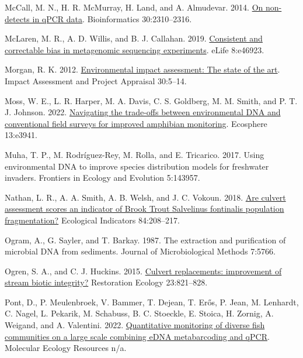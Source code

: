 \documentclass[
]{article}
\newlength{\cslhangindent}
\newlength{\cslentryspacingunit} %
\newenvironment{CSLReferences}[2] %
 {%
  \setlength{\parindent}{0pt}
  \ifodd #1
  \let\oldpar\par
  \def\par{\hangindent=\cslhangindent\oldpar}
  \fi
  \setlength{\parskip}{#2\cslentryspacingunit}
 }%
 {}
\begin{document}
\begin{CSLReferences}{1}{0}
\leavevmode{}%
McCall, M. N., H. R. McMurray, H. Land, and A. Almudevar. 2014.
\href{https://doi.org/10.1093/bioinformatics/btu239}{On non-detects in
qPCR data}. Bioinformatics 30:2310--2316.

\leavevmode{}%
McLaren, M. R., A. D. Willis, and B. J. Callahan. 2019.
\href{https://doi.org/10.7554/eLife.46923}{Consistent and correctable
bias in metagenomic sequencing experiments}. eLife 8:e46923.

\leavevmode{}%
Morgan, R. K. 2012.
\href{https://doi.org/10.1080/14615517.2012.661557}{Environmental impact
assessment: The state of the art}. Impact Assessment and Project
Appraisal 30:5--14.

\leavevmode{}%
Moss, W. E., L. R. Harper, M. A. Davis, C. S. Goldberg, M. M. Smith, and
P. T. J. Johnson. 2022.
\href{https://doi.org/10.1002/ecs2.3941}{Navigating the trade-offs
between environmental DNA and conventional field surveys for improved
amphibian monitoring}. Ecosphere 13:e3941.

\leavevmode{}%
Muha, T. P., M. Rodríguez-Rey, M. Rolla, and E. Tricarico. 2017. Using
environmental DNA to improve species distribution models for freshwater
invaders. Frontiers in Ecology and Evolution 5:143957.

\leavevmode{}%
Nathan, L. R., A. A. Smith, A. B. Welsh, and J. C. Vokoun. 2018.
\href{https://doi.org/10.1016/j.ecolind.2017.08.033}{Are culvert
assessment scores an indicator of Brook Trout Salvelinus fontinalis
population fragmentation?} Ecological Indicators 84:208--217.

\leavevmode{}%
Ogram, A., G. Sayler, and T. Barkay. 1987. The extraction and
purification of microbial DNA from sediments. Journal of Microbiological
Methods 7:5766.

\leavevmode{}%
Ogren, S. A., and C. J. Huckins. 2015.
\href{https://doi.org/10.1111/rec.12250}{Culvert replacements:
improvement of stream biotic integrity?} Restoration Ecology
23:821--828.

\leavevmode{}%
Pont, D., P. Meulenbroek, V. Bammer, T. Dejean, T. Erős, P. Jean, M.
Lenhardt, C. Nagel, L. Pekarik, M. Schabuss, B. C. Stoeckle, E. Stoica,
H. Zornig, A. Weigand, and A. Valentini. 2022.
\href{https://doi.org/10.1111/1755-0998.13715}{Quantitative monitoring
of diverse fish communities on a large scale combining eDNA
metabarcoding and qPCR}. Molecular Ecology Resources n/a.


\end{CSLReferences}
\end{document}
